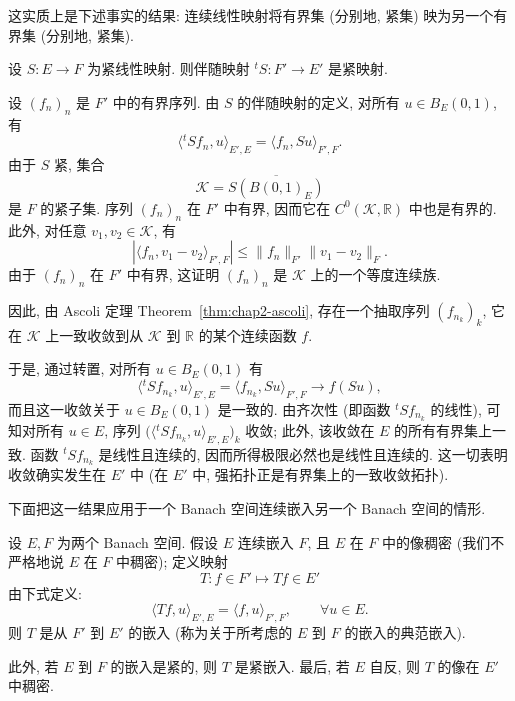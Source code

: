 \begin{Proof}
这实质上是下述事实的结果: 连续线性映射将有界集 (分别地, 紧集) 映为另一个有界集 (分别地, 紧集).
\end{Proof}

\begin{Lemma}
\label{lem:chap2-adjoint-compact}
设 $S:E\to F$ 为紧线性映射. 则伴随映射 ${}^tS:F'\to E'$ 是紧映射.
\end{Lemma}

\begin{Proof}
设 $(f_n)_n$ 是 $F'$ 中的有界序列. 由 $S$ 的伴随映射的定义, 对所有 $u\in B_E(0,1)$, 有
\[
 \langle{}^tSf_n,u\rangle_{E',E}=\langle f_n,Su\rangle_{F',F}.
\]
由于 $S$ 紧, 集合
\[
 \mathcal{K}=\overline{S(B(0,1)_E)}
\]
是 $F$ 的紧子集. 序列 $(f_n)_n$ 在 $F'$ 中有界, 因而它在 $C^0(\mathcal{K},\mathbb{R})$ 中也是有界的. 此外, 对任意 $v_1,v_2\in\mathcal{K}$, 有
\[
 |\langle f_n,v_1-v_2\rangle_{F',F}|
 \leq\|f_n\|_{F'}\|v_1-v_2\|_F.
\]
由于 $(f_n)_n$ 在 $F'$ 中有界, 这证明 $(f_n)_n$ 是 $\mathcal{K}$ 上的一个等度连续族.

因此, 由 Ascoli 定理 Theorem~\ref{thm:chap2-ascoli}, 存在一个抽取序列 $(f_{n_k})_k$, 它在 $\mathcal{K}$ 上一致收敛到从 $\mathcal{K}$ 到 $\mathbb{R}$ 的某个连续函数 $f$.

于是, 通过转置, 对所有 $u\in B_E(0,1)$ 有
\[
 \langle{}^tSf_{n_k},u\rangle_{E',E}
 =\langle f_{n_k},Su\rangle_{F',F}
 \longrightarrow f(Su),
\]
而且这一收敛关于 $u\in B_E(0,1)$ 是一致的. 由齐次性 (即函数 ${}^tSf_{n_k}$ 的线性), 可知对所有 $u\in E$, 序列 $\bigl(\langle{}^tSf_{n_k},u\rangle_{E',E}\bigr)_k$ 收敛; 此外, 该收敛在 $E$ 的所有有界集上一致. 函数 ${}^tSf_{n_k}$ 是线性且连续的, 因而所得极限必然也是线性且连续的. 这一切表明收敛确实发生在 $E'$ 中 (在 $E'$ 中, 强拓扑正是有界集上的一致收敛拓扑).
\end{Proof}

下面把这一结果应用于一个 Banach 空间连续嵌入另一个 Banach 空间的情形.

\begin{Proposition}
\label{prop:chap2-canonical-dual-embedding}
设 $E,F$ 为两个 Banach 空间. 假设 $E$ 连续嵌入 $F$, 且 $E$ 在 $F$ 中的像稠密 (我们不严格地说 $E$ 在 $F$ 中稠密); 定义映射
\[
 T:f\in F'\longmapsto Tf\in E'
\]
由下式定义:
\[
 \langle Tf,u\rangle_{E',E}=\langle f,u\rangle_{F',F},
 \qquad\forall u\in E.
\]
则 $T$ 是从 $F'$ 到 $E'$ 的嵌入 (称为关于所考虑的 $E$ 到 $F$ 的嵌入的典范嵌入).

此外, 若 $E$ 到 $F$ 的嵌入是紧的, 则 $T$ 是紧嵌入. 最后, 若 $E$ 自反, 则 $T$ 的像在 $E'$ 中稠密.
\end{Proposition}

